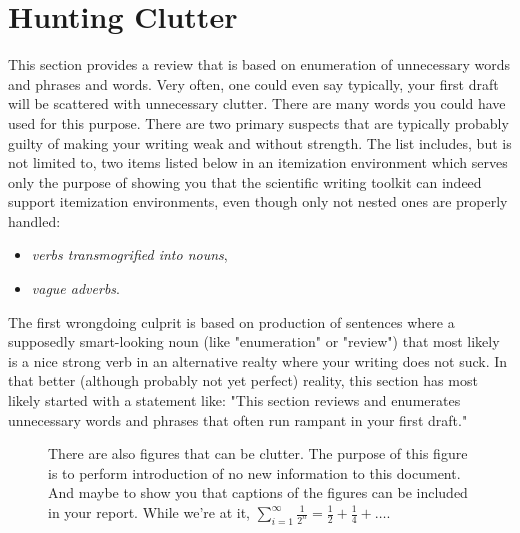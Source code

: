 \documentclass[twocolumn,11pt]{article}
\begin{document}
\section{Hunting Clutter}

This section provides a review that is based on enumeration of unnecessary words and phrases and words. Very often, one could even say typically, your first draft will be scattered with unnecessary clutter. There are many words you could have used for this purpose. There are two primary suspects that are typically probably guilty of making your writing weak and without strength. The list includes, but is not limited to, two items listed below in an itemization environment which serves only the purpose of showing you that the scientific writing toolkit can indeed support itemization environments, even though only not nested ones are properly handled: 

\begin{itemize}
	\item \emph{verbs transmogrified into nouns},
	\item \emph{vague adverbs}.
\end{itemize}

The first wrongdoing culprit is based on production of sentences where a supposedly smart-looking noun (like "enumeration" or "review") that most likely is a nice strong verb in an alternative realty where your writing does not suck. In that better (although probably not yet perfect) reality, this section has most likely started with a statement like: "This section reviews and enumerates unnecessary words and phrases that often run rampant in your first draft."

\begin{figure}
\centering
{}
\caption{There are also figures that can be clutter. The purpose of this figure is to perform introduction of no new information to this document. And maybe to show you that captions of the figures can be included in your report. While we're at it, $\sum_{i=1}^{\infty}\frac{1}{2^n}=\frac{1}{2} + \frac{1}{4} + \ldots$.}
\end{figure}
\end{document}

